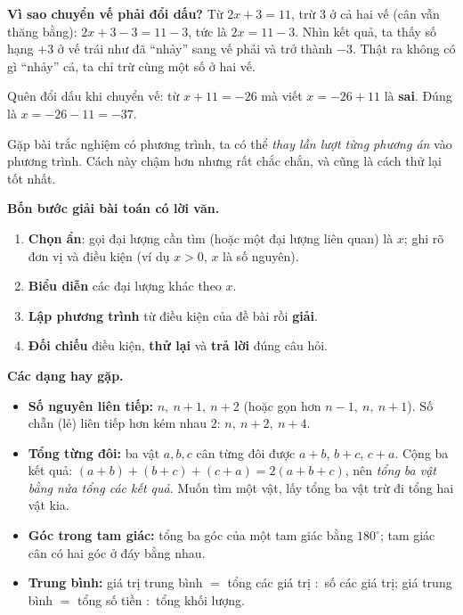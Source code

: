 \begin{proofbox}
\textbf{Vì sao chuyển vế phải đổi dấu?} Từ $2x+3=11$, trừ $3$ ở cả hai vế (cân vẫn thăng bằng):
$2x+3-3=11-3$, tức là $2x=11-3$. Nhìn kết quả, ta thấy số hạng $+3$ ở vế trái như đã ``nhảy'' sang vế phải và trở thành $-3$.
Thật ra không có gì ``nhảy'' cả, ta chỉ trừ cùng một số ở hai vế.
\end{proofbox}

\begin{warnbox}
Quên đổi dấu khi chuyển vế: từ $x+11=-26$ mà viết $x=-26+11$ là \textbf{sai}. Đúng là $x=-26-11=-37$.
\end{warnbox}

\begin{tipbox}
Gặp bài trắc nghiệm có phương trình, ta có thể \emph{thay lần lượt từng phương án} vào phương trình. Cách này
chậm hơn nhưng rất chắc chắn, và cũng là cách thử lại tốt nhất.
\end{tipbox}

\begin{knowbox}
\textbf{Bốn bước giải bài toán có lời văn.}
\begin{enumerate}[leftmargin=1.6em,itemsep=1pt,topsep=2pt]
\item \textbf{Chọn ẩn}: gọi đại lượng cần tìm (hoặc một đại lượng liên quan) là $x$; ghi rõ đơn vị và điều kiện (ví dụ $x>0$, $x$ là số nguyên).
\item \textbf{Biểu diễn} các đại lượng khác theo $x$.
\item \textbf{Lập phương trình} từ điều kiện của đề bài rồi \textbf{giải}.
\item \textbf{Đối chiếu} điều kiện, \textbf{thử lại} và \textbf{trả lời} đúng câu hỏi.
\end{enumerate}

\textbf{Các dạng hay gặp.}
\begin{itemize}[leftmargin=1.4em,itemsep=2pt,topsep=2pt]
\item \textbf{Số nguyên liên tiếp:} $n,\ n+1,\ n+2$ (hoặc gọn hơn $n-1,\ n,\ n+1$). Số chẵn (lẻ) liên tiếp hơn kém nhau $2$: $n,\ n+2,\ n+4$.
\item \textbf{Tổng từng đôi:} ba vật $a,b,c$ cân từng đôi được $a+b$, $b+c$, $c+a$. Cộng ba kết quả:
$(a+b)+(b+c)+(c+a)=2(a+b+c)$, nên \emph{tổng ba vật bằng nửa tổng các kết quả}. Muốn tìm một vật, lấy tổng ba vật trừ đi tổng hai vật kia.
\item \textbf{Góc trong tam giác:} tổng ba góc của một tam giác bằng $180^\circ$; tam giác cân có hai góc ở đáy bằng nhau.
\item \textbf{Trung bình:} giá trị trung bình $=$ tổng các giá trị $:$ số các giá trị; giá trung bình $=$ tổng số tiền $:$ tổng khối lượng.
\end{itemize}
\end{knowbox}

